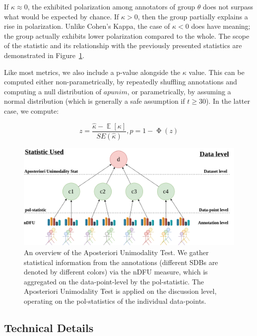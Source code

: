 \documentclass{article}
\begin{document}
If $\kappa \approx 0$, the exhibited polarization among annotators of group $\theta$ does not surpass what would be expected by chance. If $\kappa > 0$, then the group partially explains a rise in polarization. Unlike Cohen's Kappa, the case of $\kappa < 0$ does have meaning; the group actually exhibits lower polarization compared to the whole. The scope of the statistic and its relationship with the previously presented statistics are demonstrated in Figure~\ref{fig::overview}. 

Like most metrics, we also include a p-value alongside the $\kappa$ value. This can be computed either non-parametrically, by repeatedly shuffling annotations and computing a null distribution of $apunim$, or parametrically, by assuming a normal distribution (which is generally a safe assumption if $t \geq 30$). %
In the latter case, we compute:
 
\begin{equation}
	z = \frac{\hat{\kappa}  - \mathop{\mathbb{E}}[\kappa]}{SE(\hat{\kappa})}, p = 1 - \mathop{\Phi}(z)
\end{equation}

\begin{figure}
	\includegraphics[width=\linewidth]{overview.png}
	\caption{An overview of the Aposteriori Unimodality Test. We gather statistical information from the annotations (different \acp{SDB} are denoted by different colors) via the \ac{nDFU} measure, which is aggregated on the data-point-level by the pol-statistic. The Aposteriori Unimodality Test is applied on the discussion level, operating on the pol-statistics of the individual data-points.}
	\label{fig::overview}
\end{figure}


\subsection{Technical Details}
\label{ssec:methodology:details}
\end{document}
